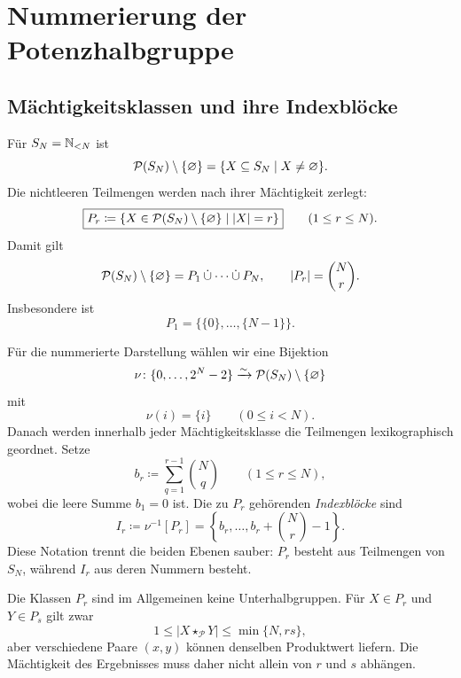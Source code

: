 \documentclass[main.tex]{subfiles}
\begin{document}
\section{Nummerierung der Potenzhalbgruppe}

\subsection{Mächtigkeitsklassen und ihre Indexblöcke}

Für \(S_N=\mathbb{N}_{<N}\) ist
\[
  \mathcal{P}(S_N)\setminus\{\varnothing\}
  =
  \{X\subseteq S_N\mid X\neq\varnothing\}.
\]
Die nichtleeren Teilmengen werden nach ihrer Mächtigkeit zerlegt:
\[
  \boxed{
  P_r
  \coloneqq
  \{X\in\mathcal{P}(S_N)\setminus\{\varnothing\}\mid |X|=r\}}
  \qquad(1\leq r\leq N).
\]
Damit gilt
\[
  \mathcal{P}(S_N)\setminus\{\varnothing\}
  =
  P_1\mathbin{\dot\cup}\cdots\mathbin{\dot\cup}P_N,
  \qquad
  |P_r|=\binom{N}{r}.
\]
Insbesondere ist
\[
  P_1=\bigl\{\{0\},\ldots,\{N-1\}\bigr\}.
\]

Für die nummerierte Darstellung wählen wir eine Bijektion
\[
  \nu\colon
  \{0,\ldots,2^N-2\}
  \xrightarrow{\sim}
  \mathcal{P}(S_N)\setminus\{\varnothing\}
\]
mit
\[
  \nu(i)=\{i\}
  \qquad(0\leq i<N).
\]
Danach werden innerhalb jeder Mächtigkeitsklasse die Teilmengen
lexikographisch geordnet.  Setze
\[
  b_r\coloneqq
  \sum_{q=1}^{r-1}\binom{N}{q}
  \qquad(1\leq r\leq N),
\]
wobei die leere Summe \(b_1=0\) ist.  Die zu \(P_r\) gehörenden
\emph{Indexblöcke} sind
\[
  \boxed{
  I_r
  \coloneqq
  \nu^{-1}[P_r]
  =
  \left\{
    b_r,\ldots,b_r+\binom{N}{r}-1
  \right\}.}
\]
Diese Notation trennt die beiden Ebenen sauber: \(P_r\) besteht aus
Teilmengen von \(S_N\), während \(I_r\) aus deren Nummern besteht.

Die Klassen \(P_r\) sind im Allgemeinen keine Unterhalbgruppen.  Für
\(X\in P_r\) und \(Y\in P_s\) gilt zwar
\[
  1\leq|X\star_{\mathcal P}Y|
  \leq\min\{N,rs\},
\]
aber verschiedene Paare \((x,y)\) können denselben Produktwert liefern.  Die
Mächtigkeit des Ergebnisses muss daher nicht allein von \(r\) und \(s\)
abhängen.
\end{document}
